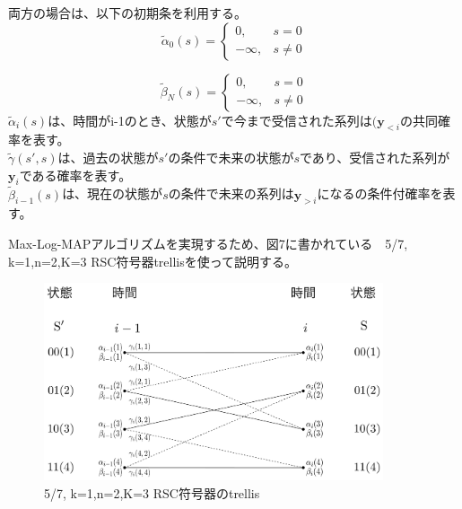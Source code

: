 \documentclass[20 pts]{article}
\begin{document}
両方の場合は、以下の初期条を利用する。
\[
    \widetilde{\alpha}_0(s)= 
\begin{cases}
   0,& s= 0\\        -\infty,              &  s\neq 0
\end{cases}
\]

\[
   \widetilde{\beta}_N(s)= 
\begin{cases}
   0,& s= 0\\        -\infty,              &  s\neq 0
\end{cases}
\]
$\widetilde{\alpha}_i(s)$は、時間がi-1のとき、状態が$s'$で今まで受信された系列は$(\boldsymbol{y}_{<i}$の共同確率を表す。\\
$\widetilde{\gamma}(s',s)$は、過去の状態が$s'$の条件で未来の状態が$s$であり、受信された系列が$\boldsymbol{y}_{i}$である確率を表す。\\
$\widetilde{\beta}_{i-1}(s)$は、現在の状態が$s$の条件で未来の系列は$\boldsymbol{y}_{>i}$になるの条件付確率を表す。

Max-Log-MAPアルゴリズムを実現するため、図7に書かれている　5/7, k=1,n=2,K=3 RSC符号器trellisを使って説明する。
\begin{figure}[h!]
\includegraphics[width=10cm]{figure3.pdf}
\caption{5/7, k=1,n=2,K=3 RSC符号器のtrellis}
\label{図2}
\end{figure}
\end{document}
